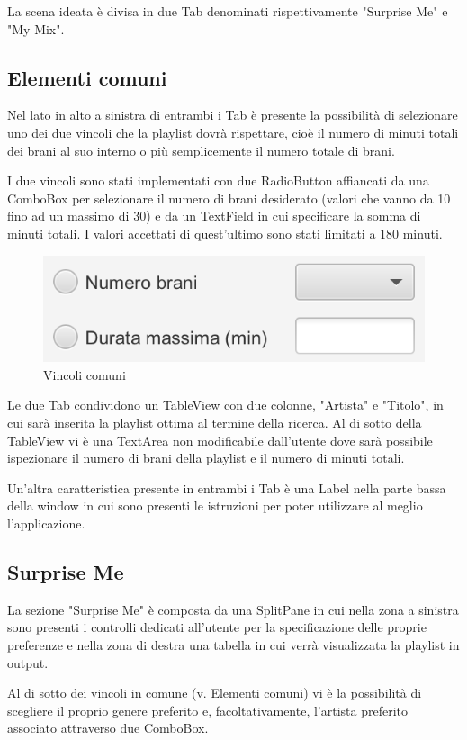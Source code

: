 \documentclass[12pt, a4paper]{article}
\begin{document}
La scena ideata è divisa in due Tab denominati rispettivamente "Surprise Me" e "My Mix".

\subsection{Elementi comuni}
Nel lato in alto a sinistra di entrambi i Tab è presente la possibilità di selezionare uno dei due vincoli che la playlist dovrà rispettare, cioè il numero di minuti totali dei brani al suo interno o più semplicemente il numero totale di brani. 

I due vincoli sono stati implementati con due RadioButton affiancati da una ComboBox per selezionare il numero di brani desiderato (valori che vanno da 10 fino ad un massimo di 30) e da un TextField in cui specificare la somma di minuti totali. I valori accettati di quest'ultimo sono stati limitati a 180 minuti.

\begin{figure}[h]
  \centering
  \includegraphics[width=0.5\linewidth]{images/vincolo_comune.png}
  \caption{Vincoli comuni}
\end{figure}

Le due Tab condividono un TableView con due colonne, "Artista" e "Titolo", in cui sarà inserita la playlist ottima al termine della ricerca. 
Al di sotto della TableView vi è una TextArea non modificabile dall'utente dove sarà possibile ispezionare il numero di brani della playlist e il numero di minuti totali.

Un'altra caratteristica presente in entrambi i Tab è una Label nella parte bassa della window in cui sono presenti le istruzioni per poter utilizzare al meglio l'applicazione.

\subsection{Surprise Me}
La sezione "Surprise Me" è composta da una SplitPane in cui nella zona a sinistra sono presenti i controlli dedicati all'utente per la specificazione delle proprie preferenze e nella zona di destra una tabella in cui verrà visualizzata la playlist in output.

Al di sotto dei vincoli in comune (v. Elementi comuni) vi è la possibilità di scegliere il proprio genere preferito e, facoltativamente, l'artista preferito associato attraverso due ComboBox.
\end{document}
